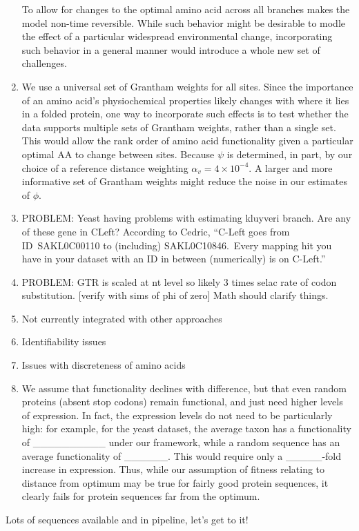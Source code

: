 \documentclass{article}
\newcommand{\alphav}{\ensuremath{\alpha_v}\xspace}
\newcommand{\alphavValue}{\ensuremath{4 \times 10^{-4}}\xspace}
\begin{document}
\begin{enumerate}
  To allow for changes to the optimal amino acid across all branches makes the model non-time reversible.
  While such behavior might be desirable to modle the effect of a particular widespread environmental change, incorporating such behavior in a general manner would introduce a whole new set of challenges.
\item We use a universal set of Grantham weights for all sites.
  Since the importance of an amino acid's physiochemical properties likely changes with where it lies in a folded protein, one way to incorporate such effects is to test whether the data supports multiple sets of Grantham weights, rather than a single set.
  This would allow the rank order of amino acid functionality given a particular optimal AA to change between sites.
  Because $\psi$ is determined, in part, by our choice of a reference distance weighting $\alphav = \alphavValue$.
  A larger and more informative set of Grantham weights might reduce the noise in our estimates of $\phi$.
\item PROBLEM: Yeast having problems with estimating kluyveri branch.  Are any of these gene in CLeft?
  According to Cedric, ``C-Left goes from ID SAKL0C00110 to (including) SAKL0C10846. Every mapping hit you have in your dataset with an ID in between (numerically) is on C-Left.''
\item PROBLEM: GTR is scaled at nt level so likely 3 times selac rate of codon substitution. [verify with sims of phi of zero]
  Math should clarify things.
\item Not currently integrated with other approaches
\item Identifiability issues
\item Issues with discreteness of amino acids
\item We assume that functionality declines with difference, but that even random proteins (absent stop codons) remain functional, and just need higher levels of expression. In fact, the expression levels do not need to be particularly high: for example, for the yeast dataset, the average taxon has a functionality of __________ under our framework, while a random sequence has an average functionality of ______. This would require only a _____-fold increase in expression. Thus, while our assumption of fitness relating to distance from optimum may be true for fairly good protein sequences, it clearly fails for protein sequences far from the optimum.
\end{enumerate}

 Lots of sequences available and in pipeline, let's get to it!
\end{document}
